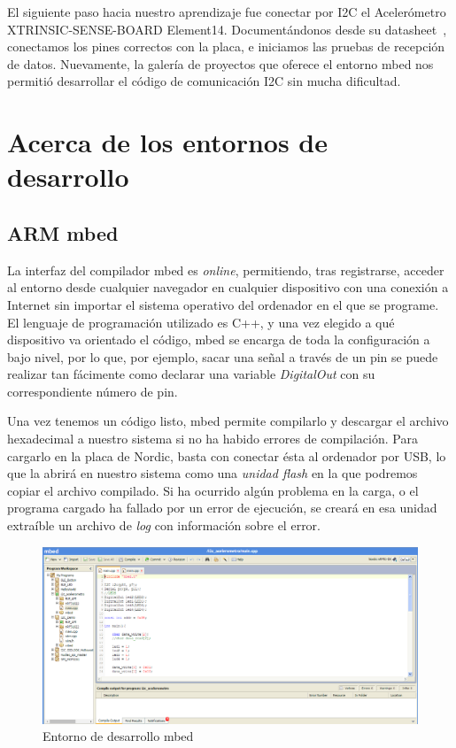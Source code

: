 El siguiente paso hacia nuestro aprendizaje fue conectar por I2C el Acelerómetro XTRINSIC-SENSE-BOARD Element14. Documentándonos desde su datasheet~\cite{DatasheetAcc}, conectamos los pines correctos con la placa, e iniciamos las pruebas de recepción de datos.
Nuevamente, la galería de proyectos que oferece el entorno mbed nos permitió desarrollar el código de comunicación I2C sin mucha dificultad.


\section{Acerca de los entornos de desarrollo}
\label{makereference4.2}

\subsection{ARM mbed}
\label{explicacionARMmbed}

La interfaz del compilador mbed es \textit{online}, permitiendo, tras registrarse, acceder al entorno desde cualquier navegador en cualquier dispositivo con una conexión a Internet sin importar el sistema operativo del ordenador en el que se programe. El lenguaje de programación utilizado es C++, y una vez elegido a qué dispositivo va orientado el código, mbed se encarga de toda la configuración a bajo nivel, por lo que, por ejemplo, sacar una señal a través de un pin se puede realizar tan fácimente como declarar una variable \textit{DigitalOut} con su correspondiente número de pin.

Una vez tenemos un código listo, mbed permite compilarlo y descargar el archivo hexadecimal a nuestro sistema si no ha habido errores de compilación. Para cargarlo en la placa de Nordic, basta con conectar ésta al ordenador por USB, lo que la abrirá en nuestro sistema como una \textit{unidad flash} en la que podremos copiar el archivo compilado. Si ha ocurrido algún problema en la carga, o el programa cargado ha fallado por un error de ejecución, se creará en esa unidad extraíble un archivo de \textit{log} con información sobre el error.

\begin{figure}[h]%
	\centering 	
    \includegraphics[width=\textwidth]{figures/mbed_compiler.PNG} %
   	\caption[Entorno de desarrollo mbed]{Entorno de desarrollo mbed}
   	\label{figuraMbedCompiler}

\end{figure}

